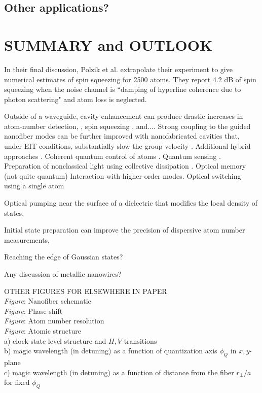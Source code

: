 \documentclass[preprint,aps,pra,onecolumn]{revtex4-1} %
\newcommand{\comment}[1]{{\color{Maroon} #1}}
\begin{document}
\subsection{Other applications?} 


\section{SUMMARY and OUTLOOK}

 
In their final discussion, Polzik et al. \cite{beguin_generation_2014} extrapolate their experiment to give numerical estimates of spin squeezing for 2500 atoms.  They report 4.2 dB of spin squeezing when the noise channel is ``damping of hyperfine coherence due to photon scattering" and atom loss is neglected. 


Outside of a waveguide, cavity enhancement can produce drastic increases in atom-number detection, \cite{zhang_collective_2012}, spin squeezing \cite{bohnet_reduced_2014}, and....   Strong coupling to the guided nanofiber modes can be further improved with nanofabricated cavities that, under EIT conditions, substantially slow the group velocity \cite{le_kien_intracavity_2009,wuttke_nanofiber_2012,nayak_optical_2014}.  Additional hybrid approaches \cite{hafezi_atomic_2012, yalla_cavity_2014}.  Coherent quantum control of atoms \cite{smith_quantum_2013-1}.  Quantum sensing \cite{kumar_autler-townes_2015}.  Preparation of nonclassical light using collective dissipation \cite{gonzalez-tudela_deterministic_2015}.  Optical memory (not quite quantum) \cite{sayrin_storage_2015, gouraud_demonstration_2015} Interaction with higher-order modes.  Optical switching using a single atom \cite{oshea_fiber-optical_2013} 

Optical pumping near the surface of a dielectric that modifies the local density of states, 

Initial state preparation can improve the precision of dispersive atom number measurements, 

Reaching the edge of Gaussian states?

\cite{scheel_directional_2015}
\comment{Any discussion of metallic nanowires?}

\comment{
OTHER FIGURES FOR ELSEWHERE IN PAPER \\
\emph{Figure}: Nanofiber schematic \\
\emph{Figure}: Phase shift \\
\emph{Figure}: Atom number resolution \\
\emph{Figure}: Atomic structure \\
a) clock-state level structure and $H,V$-transitions \\
b) magic wavelength (in detuning) as a function of quantization axis $\phi_Q$ in $x,y$-plane \\
c) magic wavelength (in detuning) as a function of distance from the fiber $r_\perp/a$ for fixed $\phi_Q$ 

}
\end{document}
